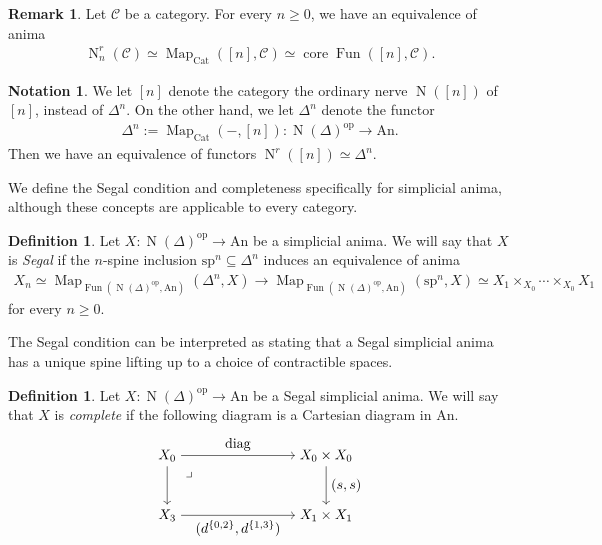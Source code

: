 \documentclass[a4paper,dvipdfmx,11pt,reqno]{amsart}
\DeclareMathOperator{\Map}{Map}
\DeclareMathOperator{\myop}{op}
\DeclareMathOperator{\N}{N}
\DeclareMathOperator{\Fun}{Fun}
\newcommand{\C}{\mathcal{C}}
\DeclareMathOperator{\core}{core}
\newcommand{\An}{\mathrm{An}}
\newcommand{\Cat}{\mathrm{Cat}}
\theoremstyle{definition}
\newtheorem{definition}[theorem]{Definition}
\newtheorem{notation}[theorem]{Notation}
\newtheorem{remark}[theorem]{Remark}
\begin{document}
\begin{remark}
  Let $\C$ be a category.
  For every $n \geq 0$, we have an equivalence of anima
  \begin{align*}
    \N^r_n(\C) \simeq \Map_{\Cat}([n],\C) \simeq \core\Fun([n],\C).
  \end{align*}
\end{remark}

\begin{notation}
  We let $[n]$ denote the category the ordinary nerve $\N([n])$ of $[n]$, instead of $\Delta^n$.
  On the other hand, we let $\Delta^n$ denote the functor 
  \begin{align*}
    \Delta^n := \Map_{\Cat}(-,[n]) : \N(\Delta)^{\myop} \to \An.
  \end{align*}
  Then we have an equivalence of functors $\N^r([n]) \simeq \Delta^n$.
\end{notation}

We define the Segal condition and completeness specifically for simplicial anima, although these concepts are applicable to every category.

\begin{definition}
  Let $X : \N(\Delta)^{\myop} \to \An$ be a simplicial anima.
  We will say that $X$ is \textit{Segal} if the $n$-spine inclusion $\mathrm{sp}^n \subseteq \Delta^n$ induces an equivalence of anima 
  \begin{align*}
    X_n \simeq \Map_{\Fun(\N(\Delta)^{\myop},\An)}(\Delta^n,X) \to \Map_{\Fun(\N(\Delta)^{\myop},\An)}(\mathrm{sp}^n,X) \simeq X_1 \times_{X_0} \cdots \times_{X_0} X_1
  \end{align*}
  for every $n \geq 0$.
\end{definition}

The Segal condition can be interpreted as stating that a Segal simplicial anima has a unique spine lifting up to a choice of contractible spaces.

\begin{definition}
  Let $X : \N(\Delta)^{\myop} \to \An$ be a Segal simplicial anima.
  We will say that $X$ is \textit{complete} if the following diagram is a Cartesian diagram in $\An$.
  \[\begin{tikzpicture}[auto,->] 
    \node (tl) at (0,1.5) {$X_0$}; 
    \node (tr) at (4,1.5) {$X_0 \times X_0$};
    \node (bl) at (0,0) {$X_3$}; 
    \node (br) at (4,0) {$X_1 \times X_1$}; 
    \draw (tl) -- node {$\mathrm{diag}$} (tr); 
    \draw (bl) -- node[swap] {$(d^{\{0,2\}},d^{\{1,3\}})$} (br); 
    \draw (tl) -- node[swap] {} (bl);
    \draw (tr) -- node {$(s,s)$} (br); 
    \node at ([xshift=0.2cm, yshift=-0.2cm] tl.south east) {$\lrcorner$};
  \end{tikzpicture}\]
\end{definition}
\end{document}
